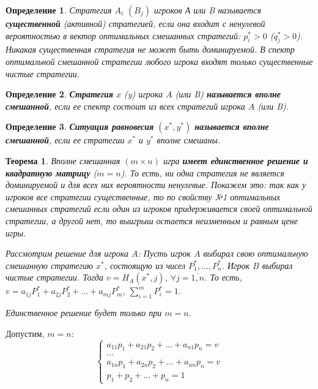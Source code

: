 \documentclass{article}
\newtheorem{definition}{Определение}
\newtheorem{theorem}{Теорема}
\begin{document}
\begin{definition}
    Стратегия $A_{i}$ $(B_{j})$ игроков А или B называется \textbf{существенной} (активной) стратегией, если она входит с ненулевой вероятностью в вектор оптимальных смешанных стратегий: $p_{i}^{*} > 0$ ($q_{j}^{*} > 0$).
    Никакая существенная стратегия не может быть доминируемой. В спектр оптимальной смешанной стратегии любого игрока входят только существенные чистые стратегии.
\end{definition}

\begin{definition}
    \textbf{Стратегия} $x$ (y) игрока $A$ (или B) \textbf{называется вполне смешанной}, если ее спектр состоит из всех стратегий игрока $A$ (или B).
\end{definition}

\begin{definition}
    \textbf{Ситуация равновесия} $(x^{*}, y^{*})$ \textbf{называется вполне смешанной}, если ее стратегии $x^{*}$ и $y^{*}$ вполне смешаны.
\end{definition}

\begin{theorem}
    Вполне смешанная $(m \times n)$ игра \textbf{имеет единственное решение и квадратную матрицу} ($m = n$). То есть, ни одна стратегия не является доминируемой и для всех них вероятности ненулевые. Покажем это: так как у игроков все стратегии существенные, то по свойству №1 оптимальных смешанных стратегий если один из игроков придерживается своей оптимальной стратегии, а другой нет, то выигрыш остается неизменным и равным цене игры.

    Рассмотрим решение для игрока $A$: Пусть игрок $A$ выбирал свою оптимальную смешанную стратегию $x^{*}$, состоящую из чисел $P_{1}^{*}, \dots, P_{n}^{*}$. Игрок $B$ выбирал чистые стратегии. Тогда $v = H_{A}(x^{*}, j)$, $\forall j = \overline{1, n}$. То есть, $v = a_{1 j} P_{1}^{*} + a_{2 j} P_{2}^{*} + \dots + a_{m j} P_{m}^{*}$, $\sum\limits_{i = 1}^{m} P_{i}^{*} = 1$.

    Единственное решение будет только при $m = n$.
\end{theorem}

Допустим, $m = n$: \begin{equation}
    \begin{cases}
        a_{1 1} p_{1} + a_{21} p_{2} + \dots + a_{n 1} p_{n} = v \\
        \dots \\
        a_{1 n} p_{1} + a_{2 n} p_{2} + \dots + a_{n n} p_{n} = v \\
        p_{1} + p_{2} + \dots + p_{n} = 1
    \end{cases}
\end{equation}
\end{document}
